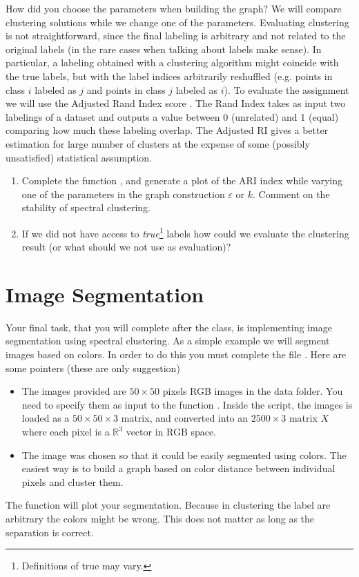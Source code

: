\documentclass{article}
\begin{document}
How did you choose the parameters when building the graph?
We will compare clustering solutions while we change one of the parameters.
Evaluating clustering is not straightforward, since the final labeling
is arbitrary and not related to the original labels (in the rare cases
when talking about labels make sense). In particular, a labeling obtained
with a clustering algorithm might coincide with the true labels, but with
the label indices arbitrarily reshuffled (e.g. points in class $i$ labeled
as $j$ and points in class $j$ labeled as $i$).
To evaluate the assignment
we will use the Adjusted Rand Index score \cite{wagner2007comparing}.
The Rand Index takes as input two labelings of a dataset
and outputs a value between 0 (unrelated) and 1 (equal)
comparing how much these labeling overlap. The Adjusted RI
gives a better estimation for large number of clusters at the expense
of some (possibly unsatisfied) statistical assumption.
\begin{enumerate}[resume]
    \item Complete the function , and
        generate a plot of the ARI index while varying one of the
        parameters in the graph construction $\varepsilon$ or $k$.
        Comment on the stability of spectral clustering.
    \item If we did not have access to \emph{true}\footnote{Definitions of
            true may vary.} labels how could we evaluate the clustering
        result (or what should we not use as evaluation)?
\end{enumerate}


\section{Image Segmentation}
Your final task, that you will complete after the class, is implementing
image segmentation using spectral clustering. As a simple example we will
segment images based on colors. In order to do this you must complete the file
. Here are some pointers (these are only suggestion)

\begin{itemize}
    \item The images provided are $50 \times 50$ pixels RGB images in the data folder. You
        need to specify them as input to the function .
        Inside the script, the images is loaded as a $50 \times 50 \times 3$ matrix,
        and converted into an $2500 \times 3$ matrix $X$
         where each pixel is a $\mathbb{R}^3$
        vector in RGB space.
    \item The image was chosen so that it could be easily segmented using
        colors. The easiest way is to build a graph based on color distance
        between individual pixels and cluster them.
\end{itemize}
The function  will plot your segmentation. Because in clustering
the label are arbitrary the colors might be wrong. This does not matter as long
as the separation is correct.
\end{document}
